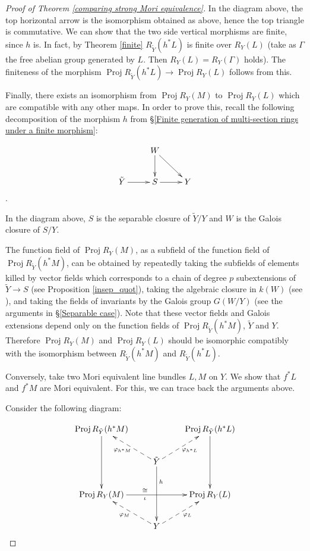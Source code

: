 \documentclass[12pt,twoside]{amsart}
\theoremstyle{definition}
\newcommand\Proj{\mathop{\mathrm{Proj}}}
\begin{document}
\begin{proof}[Proof of Theorem \ref{comparing strong Mori equivalence}]
In the diagram above, the top horizontal arrow is the isomorphism obtained as above, hence
the top triangle is commutative.
We can show that the two side vertical morphisms are finite, since $h$ is.
In fact, by Theorem \ref{finite} $R_{\tilde{Y}}(h^{*}L)$ is finite
over $R_{Y}(L)$  (take as $\Gamma$ the free abelian group generated by $L$.
Then $R_{Y}(L)=R_Y(\Gamma)$ holds). The finiteness of the morphism $\Proj{R_{\tilde{Y}}(h^{*}L)}\to
\Proj{R_{Y}(L)}$ follows from this.

 
Finally, there exists an isomorphism from $\Proj{R_{Y}(M)}$ to $\Proj{R_{Y}(L)}$
which are compatible with any other maps.
In order to prove this, recall the following decomposition of the morphism $h$ from
\S\ref{Finite generation of multi-section rings under a finite morphism}:

\[
\xymatrix{
 & W \ar[d] \ar[rd] &\\
\tilde{Y} \ar[r] & S \ar[r] & Y\\}\].

In the diagram above, $S$ is the separable closure of $\tilde{Y}/Y$ and $W$ is the Galois closure
of $S/Y$.

The function field of $\Proj{R_{Y}(M)}$, as a subfield of the function field
of $\Proj{R_{\tilde{Y}}(h^{*}M)}$, can be obtained by repeatedly taking the subfields of elements killed by
vector fields which corresponds to a chain of degree $p$ subextensions of $\tilde{Y}\to S$ (see Proposition \ref{insep_quot}),
taking the algebraic closure in $k(W)$ (see \cite[Example 2.1.12]{l}),
and taking the fields of invariants by the Galois group $G(W/Y)$
(see the arguments in \S\ref{Separable case}).
Note that these vector fields and Galois extensions depend only on the function fields
of $\Proj{R_{\tilde{Y}}(h^{*}M)}$, $\tilde{Y}$ and $Y$. Therefore
$\Proj{R_{Y}(M)}$ and $\Proj{R_{Y}(L)}$ should be isomorphic compatibly with the isomorphism
between $R_{\tilde{Y}}(h^{*}M)$ and $R_{\tilde{Y}}(h^{*}L)$.


Conversely, take two Mori equivalent line bundles $L, M$ on $Y$. We show that $f^{*}L$ and $f^{*}M$ are
Mori equivalent. For this, we can trace back the arguments above.

Consider the following diagram:

\[
\xymatrix{
\Proj{R_{\tilde{Y}}(h^{*}M)} \ar[dd] & & \Proj{R_{\tilde{Y}}(h^{*}L)}  \ar[dd]\\
& \tilde{Y} \ar@{-->}[lu]^{\varphi_{h^{*}M}} \ar@{-->}[ru]_{\varphi_{h^{*}L}} \ar[dd]^(0.3){h}& \\
\Proj{R_{Y}(M)} \ar[rr]^(0.4){\cong}_(0.4){\iota}  & & \Proj{R_{Y}(L)} \\
& Y \ar@{-->}[lu]^{\varphi_{M}} \ar@{-->}[ru]_{\varphi_{L}} & \\}\]


\end{proof}
\end{document}
